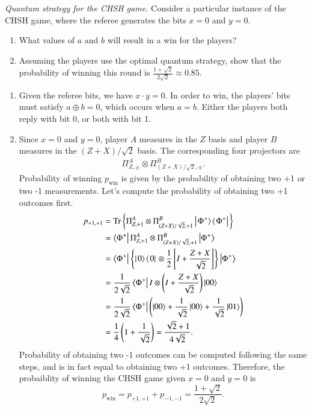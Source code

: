 \begin{exercise}
\emph{Quantum strategy for the CHSH game.} Consider a particular instance of the CHSH game, where the referee generates the bits $x=0$ and $y=0$.
\begin{enumerate}[label=(\alph*)]
    \item What values of $a$ and $b$ will result in a win for the players?
    \item Assuming the players use the optimal quantum strategy, show that the probability of winning this round is $\frac{1+\sqrt{2}}{2\sqrt{2}}\approx0.85$.
\end{enumerate}
\end{exercise}
\begin{solution}
\begin{enumerate}[label=(\alph*)]
    \item Given the referee bits, we have $x\cdot y=0$. In order to win, the players' bits must satisfy $a\oplus b=0$, which occurs when $a=b$. Either the players both reply with bit 0, or both with bit 1.
    \item Since $x=0$ and $y=0$, player $A$ measures in the $Z$ basis and player $B$ measures in the $(Z+X)/\sqrt{2}$ basis. The corresponding four projectors are
    \begin{align*}
        \Pi^A_{Z,\pm} \otimes \Pi^B_{(Z+X)/\sqrt{2},\pm}.
    \end{align*}
    Probability of winning $p_{\text{win}}$ is given by the probability of obtaining two +1 or two -1 measurements.
    Let's compute the probability of obtaining two +1 outcomes first.
    \begin{align*}
        p_{+1,+1} & = \text{Tr}\left\{ \Pi^A_{Z,+1} \otimes \Pi^B_{(Z+X)/\sqrt{2},+1} \left|\left. \Phi^+ \rangle\right.\!\langle\left. \Phi^+ \right|\right.  \right\} \\
        & = \left\langle \Phi^+ \right| \Pi^A_{Z,+1} \otimes \Pi^B_{(Z+X)/\sqrt{2},+1} \left| \Phi^+ \right\rangle \\
        & = \left\langle \Phi^+ \right| \left\{ \left|\left. 0 \rangle\right.\!\langle\left. 0 \right|\right.  \otimes \frac{1}{2}\left[ I + \frac{Z+X}{\sqrt{2}} \right] \right\} \left| \Phi^+ \right\rangle \\
        & = \frac{1}{2\sqrt{2}} \left\langle \Phi^+ \right| I \otimes \left( I + \frac{Z+X}{\sqrt{2}} \right) \left| 00 \right\rangle \\
        & = \frac{1}{2\sqrt{2}} \left\langle \Phi^+ \right| \left( \left| 00 \right\rangle + \frac{1}{\sqrt{2}}\left| 00 \right\rangle + \frac{1}{\sqrt{2}}\left| 01 \right\rangle \right) \\
        & = \frac{1}{4} \left( 1 + \frac{1}{\sqrt{2}} \right) = \frac{\sqrt{2}+1}{4\sqrt{2}}.
    \end{align*}
    Probability of obtaining two -1 outcomes can be computed following the same steps, and is in fact equal to obtaining two +1 outcomes.
    Therefore, the probaiblity of winning the CHSH game given $x=0$ and $y=0$ is
    \begin{equation*}
        p_{\text{win}} = p_{+1,+1} + p_{-1,-1} = \frac{1+\sqrt{2}}{2\sqrt{2}}.
    \end{equation*}
\end{enumerate}
\end{solution}

